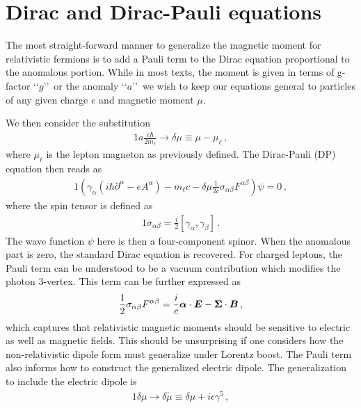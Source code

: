 \section{Dirac and Dirac-Pauli equations}\label{ajsss:diracpauli}
The most straight-forward manner to generalize the magnetic moment for relativistic fermions is to add a Pauli term to the Dirac equation proportional to the anomalous portion. While in most texts, the moment is given in terms of g-factor \lq\lq$g$\rq\rq\ or the anomaly \lq\lq$a$\rq\rq\ we wish to keep our equations general to particles of any given charge $e$ and magnetic moment $\mu$.

We then consider the substitution
\begin{alignat}{1}
	\label{eq:diracpauli:01a} a\frac{e\hbar}{2m_{\ell}}\longrightarrow\delta\mu\equiv\mu-\mu_{\ell}\,,
\end{alignat}
where $\mu_{\ell}$ is the lepton magneton as previously defined. The Dirac-Pauli (DP) equation then reads as
\begin{alignat}{1}
	\label{eq:diracpauli:01b} \left(\gamma_{\alpha}(i\hbar\partial^{\alpha}-eA^{\alpha})-m_{\ell}c-\delta\mu\frac{1}{2c}\sigma_{\alpha\beta}F^{\alpha\beta}\right)\psi=0\,,
\end{alignat}
where the spin tensor is defined as
\begin{alignat}{1}
	\label{eq:diracpauli:02} \sigma_{\alpha\beta}=\frac{i}{2}\left[\gamma_{\alpha},\gamma_{\beta}\right]\,.
\end{alignat}
The wave function $\psi$ here is then a four-component spinor. When the anomalous part is zero, the standard Dirac equation is recovered. For charged leptons, the Pauli term can be understood to be a vacuum contribution which modifies the photon 3-vertex. This term can be further expressed as
\begin{alignat}{1}
	\label{eq:diracpauli:03} \frac{1}{2}\sigma_{\alpha\beta}F^{\alpha\beta}=\frac{i}{c}\boldsymbol{\alpha}\cdot\boldsymbol{E}-\boldsymbol{\Sigma}\cdot\boldsymbol{B}\,,
\end{alignat}
which captures that relativistic magnetic moments should be sensitive to electric as well as magnetic fields. This should be unsurprising if one considers how the non-relativistic dipole form must generalize under Lorentz boost. The Pauli term also informs how to construct the generalized electric dipole. The generalization to include the electric dipole is
\begin{alignat}{1}
	\label{eq:diracpauli:04} \delta\mu\rightarrow\delta\tilde{\mu}\equiv\delta\mu+i\epsilon\gamma^{5}\,,
\end{alignat}
